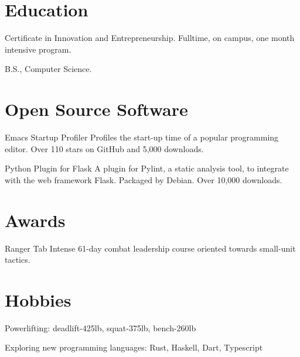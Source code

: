 \documentclass[letterpaper]{jschaf-resume}
\begin{document}
\begin{paracol}{2}
\section{Education}

Certificate in Innovation and Entrepreneurship.
Fulltime, on campus, one month intensive program.

B.S., Computer Science.

\switchcolumn

\section{Open Source Software}

Emacs Startup Profiler Profiles the start-up time of a popular programming
editor.  Over 110 stars on GitHub and 5,000 downloads.

Python Plugin for Flask A plugin for Pylint, a static analysis tool, to
integrate with the web framework Flask.  Packaged by Debian.  Over 10,000
downloads.


\section{Awards}
Ranger Tab Intense 61-day combat leadership course oriented towards small-unit
tactics.


\section{Hobbies}
Powerlifting: deadlift-425lb, squat-375lb, bench-260lb

Exploring new programming languages: Rust, Haskell, Dart, Typescript

\end{paracol}

\end{document}

